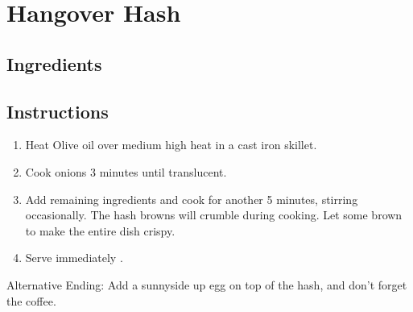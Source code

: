 \documentclass[letterpaper,10pt,english]{sphinxmanual}
\begin{document}
\chapter{Hangover Hash}
\label{\detokenize{Hangover_Hash:hangover-hash}}\label{\detokenize{Hangover_Hash::doc}}

\section{Ingredients}
\label{\detokenize{Hangover_Hash:ingredients}}
%
\begin{sphinxVerbatim}[commandchars=\\\{\}]
      

       

    

   

   
\end{sphinxVerbatim}


\section{Instructions}
\label{\detokenize{Hangover_Hash:instructions}}\begin{enumerate}
\item {} 
Heat Olive oil over medium high heat in a cast iron skillet.

\item {} 
Cook onions 3 minutes until translucent.

\item {} 
Add remaining ingredients and cook for another 5 minutes, stirring occasionally. The hash browns will crumble during cooking. Let some brown to make the entire dish crispy.

\item {} 
Serve immediately .

\end{enumerate}

Alternative Ending: Add a sunnyside up egg on top of the hash, and don’t forget the coffee.
\end{document}
